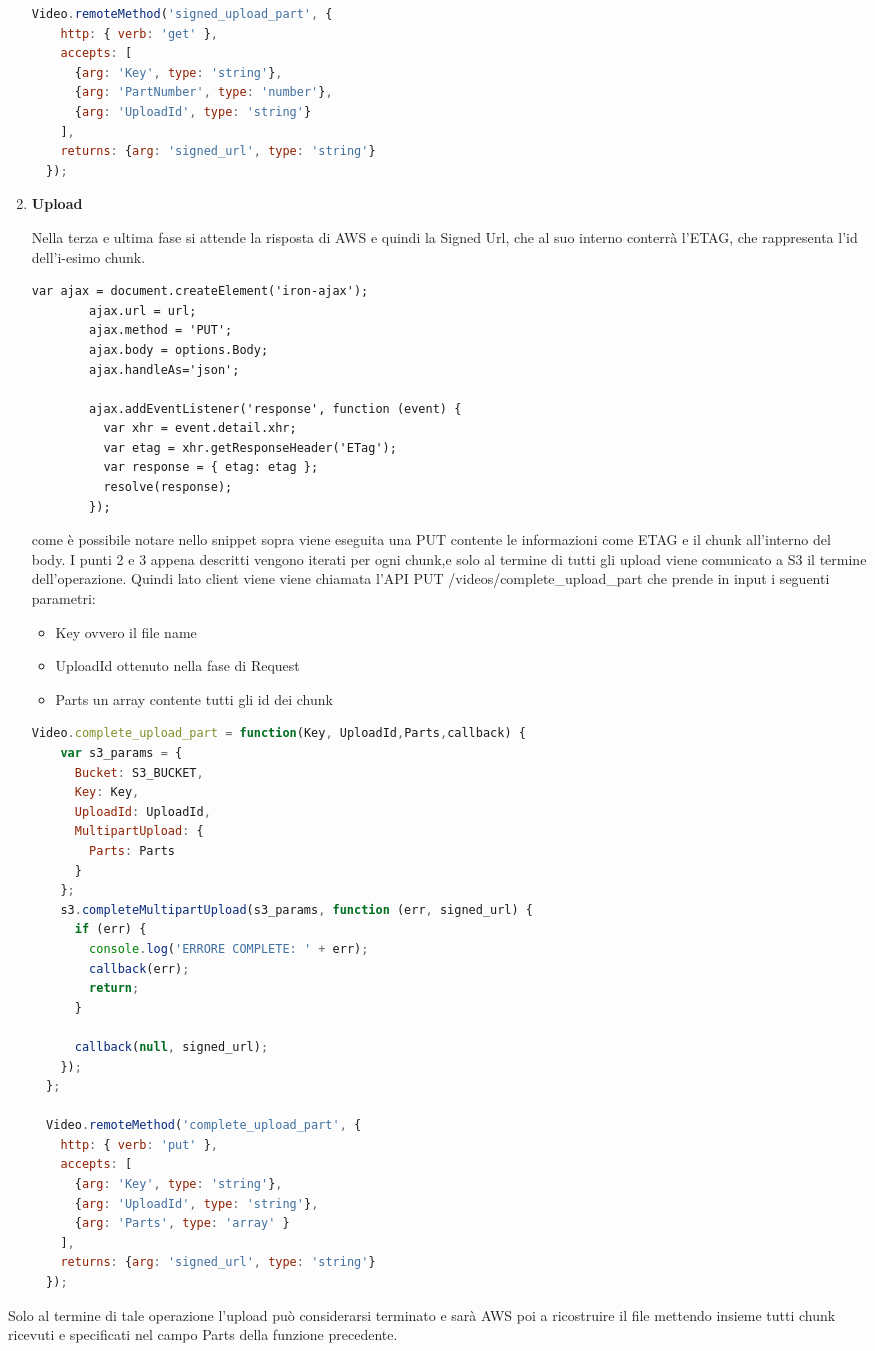 \begin{enumerate}
\begin{lstlisting}[language=javascript]
  Video.remoteMethod('signed_upload_part', {
    http: { verb: 'get' },
    accepts: [
      {arg: 'Key', type: 'string'},
      {arg: 'PartNumber', type: 'number'},
      {arg: 'UploadId', type: 'string'}
    ],
    returns: {arg: 'signed_url', type: 'string'}
  });
\end{lstlisting}

\item \textbf{Upload}

Nella terza e ultima fase si attende la risposta di AWS e quindi la Signed Url, che al suo interno conterrà l’ETAG, che rappresenta l’id dell’i-esimo chunk.
\begin{lstlisting}[language=html]
var ajax = document.createElement('iron-ajax');
        ajax.url = url;
        ajax.method = 'PUT';
        ajax.body = options.Body;
        ajax.handleAs='json';

        ajax.addEventListener('response', function (event) {
          var xhr = event.detail.xhr;
          var etag = xhr.getResponseHeader('ETag');
          var response = { etag: etag };
          resolve(response);
        });
\end{lstlisting}

come è possibile notare nello snippet sopra viene eseguita una PUT  contente le informazioni come ETAG e il chunk all’interno del body.
I punti 2 e 3 appena descritti vengono iterati per ogni chunk,e solo al termine di tutti gli upload viene comunicato a S3 il termine dell'operazione.
Quindi lato client viene viene chiamata l'API PUT /videos/complete\_upload\_part che prende in input i seguenti parametri:
  \begin{itemize}
      \item Key ovvero il file name
      \item UploadId ottenuto nella fase di Request
      \item Parts un array contente tutti gli id dei chunk

  \end{itemize}

\begin{lstlisting}[language=javascript]
Video.complete_upload_part = function(Key, UploadId,Parts,callback) {
    var s3_params = {
      Bucket: S3_BUCKET,
      Key: Key,
      UploadId: UploadId,
      MultipartUpload: {
        Parts: Parts
      } 
    };
    s3.completeMultipartUpload(s3_params, function (err, signed_url) {
      if (err) {
        console.log('ERRORE COMPLETE: ' + err);
        callback(err);
        return;
      }

      callback(null, signed_url);
    });
  };

  Video.remoteMethod('complete_upload_part', {
    http: { verb: 'put' },
    accepts: [
      {arg: 'Key', type: 'string'},
      {arg: 'UploadId', type: 'string'},
      {arg: 'Parts', type: 'array' }
    ],
    returns: {arg: 'signed_url', type: 'string'}
  });

\end{lstlisting}

\end{enumerate}
Solo al termine di tale operazione l'upload può considerarsi terminato e sarà AWS poi a ricostruire il file mettendo insieme tutti chunk ricevuti e specificati nel campo Parts della funzione precedente.
